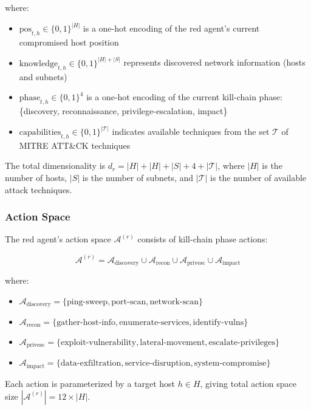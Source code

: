 \documentclass[11pt]{article}
\newcounter{phase}[algorithm]
\theoremstyle{definition}
\theoremstyle{plain}
\newcommand{\MC}[1]{\mathcal{#1}}
\begin{document}
where:
\begin{itemize}
    \item $\text{pos}_{t,h} \in \{0,1\}^{|H|}$ is a one-hot encoding of the red agent's current compromised host position
    \item $\text{knowledge}_{t,h} \in \{0,1\}^{|H| + |S|}$ represents discovered network information (hosts and subnets)
    \item $\text{phase}_{t,h} \in \{0,1\}^4$ is a one-hot encoding of the current kill-chain phase: \{discovery, reconnaissance, privilege-escalation, impact\}
    \item $\text{capabilities}_{t,h} \in \{0,1\}^{|\MC{T}|}$ indicates available techniques from the set $\MC{T}$ of MITRE ATT\&CK techniques
\end{itemize}

The total dimensionality is $d_r = |H| + |H| + |S| + 4 + |\MC{T}|$, where $|H|$ is the number of hosts, $|S|$ is the number of subnets, and $|\MC{T}|$ is the number of available attack techniques.

\subsubsection{Action Space}
The red agent's action space $\MC{A}^{(r)}$ consists of kill-chain phase actions:

\begin{equation}
\MC{A}^{(r)} = \MC{A}_{\text{discovery}} \cup \MC{A}_{\text{recon}} \cup \MC{A}_{\text{privesc}} \cup \MC{A}_{\text{impact}}
\end{equation}

where:
\begin{itemize}
    \item $\MC{A}_{\text{discovery}} = \{\text{ping-sweep}, \text{port-scan}, \text{network-scan}\}$
    \item $\MC{A}_{\text{recon}} = \{\text{gather-host-info}, \text{enumerate-services}, \text{identify-vulns}\}$
    \item $\MC{A}_{\text{privesc}} = \{\text{exploit-vulnerability}, \text{lateral-movement}, \text{escalate-privileges}\}$
    \item $\MC{A}_{\text{impact}} = \{\text{data-exfiltration}, \text{service-disruption}, \text{system-compromise}\}$
\end{itemize}

Each action is parameterized by a target host $h \in H$, giving total action space size $|\MC{A}^{(r)}| = 12 \times |H|$.
\end{document}
